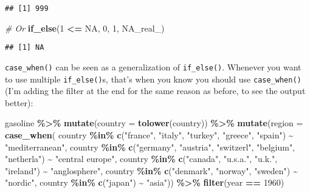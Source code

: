 \documentclass[
]{article}
\newenvironment{Shaded}{\begin{snugshade}}{\end{snugshade}}
\newcommand{\CommentTok}[1]{\textcolor[rgb]{0.56,0.35,0.01}{\textit{#1}}}
\newcommand{\DataTypeTok}[1]{\textcolor[rgb]{0.13,0.29,0.53}{#1}}
\newcommand{\DecValTok}[1]{\textcolor[rgb]{0.00,0.00,0.81}{#1}}
\newcommand{\KeywordTok}[1]{\textcolor[rgb]{0.13,0.29,0.53}{\textbf{#1}}}
\newcommand{\NormalTok}[1]{#1}
\newcommand{\OperatorTok}[1]{\textcolor[rgb]{0.81,0.36,0.00}{\textbf{#1}}}
\newcommand{\OtherTok}[1]{\textcolor[rgb]{0.56,0.35,0.01}{#1}}
\newcommand{\StringTok}[1]{\textcolor[rgb]{0.31,0.60,0.02}{#1}}
\begin{document}
\begin{verbatim}
## [1] 999
\end{verbatim}

\begin{Shaded}
\begin{Highlighting}[]
\CommentTok{\# Or}
\KeywordTok{if\_else}\NormalTok{(}\DecValTok{1} \OperatorTok{\textless{}=}\StringTok{ }\OtherTok{NA}\NormalTok{, }\DecValTok{0}\NormalTok{, }\DecValTok{1}\NormalTok{, }\OtherTok{NA\_real\_}\NormalTok{)}
\end{Highlighting}
\end{Shaded}

\begin{verbatim}
## [1] NA
\end{verbatim}

\texttt{case\_when()} can be seen as a generalization of \texttt{if\_else()}. Whenever you want to use multiple
\texttt{if\_else()}s, that's when you know you should use \texttt{case\_when()} (I'm adding the filter at the end
for the same reason as before, to see the output better):

\begin{Shaded}
\begin{Highlighting}[]
\NormalTok{gasoline }\OperatorTok{\%\textgreater{}\%}
\StringTok{  }\KeywordTok{mutate}\NormalTok{(}\DataTypeTok{country =} \KeywordTok{tolower}\NormalTok{(country)) }\OperatorTok{\%\textgreater{}\%}
\StringTok{  }\KeywordTok{mutate}\NormalTok{(}\DataTypeTok{region =} \KeywordTok{case\_when}\NormalTok{(}
\NormalTok{           country }\OperatorTok{\%in\%}\StringTok{ }\KeywordTok{c}\NormalTok{(}\StringTok{"france"}\NormalTok{, }\StringTok{"italy"}\NormalTok{, }\StringTok{"turkey"}\NormalTok{, }\StringTok{"greece"}\NormalTok{, }\StringTok{"spain"}\NormalTok{) }\OperatorTok{\textasciitilde{}}\StringTok{ "mediterranean"}\NormalTok{,}
\NormalTok{           country }\OperatorTok{\%in\%}\StringTok{ }\KeywordTok{c}\NormalTok{(}\StringTok{"germany"}\NormalTok{, }\StringTok{"austria"}\NormalTok{, }\StringTok{"switzerl"}\NormalTok{, }\StringTok{"belgium"}\NormalTok{, }\StringTok{"netherla"}\NormalTok{) }\OperatorTok{\textasciitilde{}}\StringTok{ "central europe"}\NormalTok{,}
\NormalTok{           country }\OperatorTok{\%in\%}\StringTok{ }\KeywordTok{c}\NormalTok{(}\StringTok{"canada"}\NormalTok{, }\StringTok{"u.s.a."}\NormalTok{, }\StringTok{"u.k."}\NormalTok{, }\StringTok{"ireland"}\NormalTok{) }\OperatorTok{\textasciitilde{}}\StringTok{ "anglosphere"}\NormalTok{,}
\NormalTok{           country }\OperatorTok{\%in\%}\StringTok{ }\KeywordTok{c}\NormalTok{(}\StringTok{"denmark"}\NormalTok{, }\StringTok{"norway"}\NormalTok{, }\StringTok{"sweden"}\NormalTok{) }\OperatorTok{\textasciitilde{}}\StringTok{ "nordic"}\NormalTok{,}
\NormalTok{           country }\OperatorTok{\%in\%}\StringTok{ }\KeywordTok{c}\NormalTok{(}\StringTok{"japan"}\NormalTok{) }\OperatorTok{\textasciitilde{}}\StringTok{ "asia"}\NormalTok{)) }\OperatorTok{\%\textgreater{}\%}
\StringTok{  }\KeywordTok{filter}\NormalTok{(year }\OperatorTok{==}\StringTok{ }\DecValTok{1960}\NormalTok{)}
\end{Highlighting}
\end{Shaded}
\end{document}
